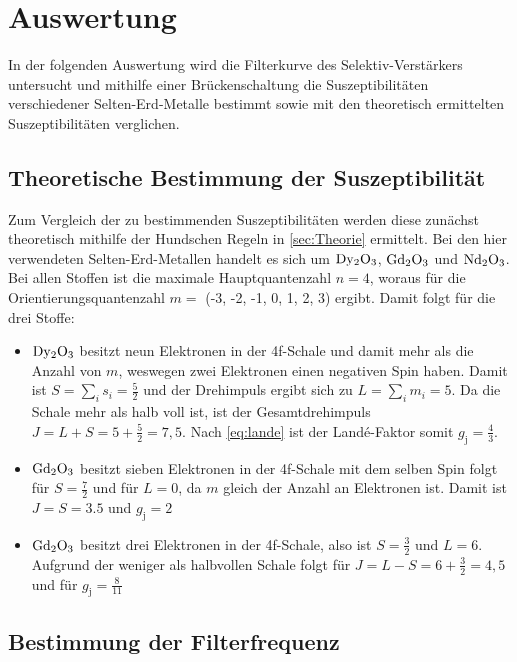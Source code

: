\section{Auswertung}
\label{sec:Auswertung}

In der folgenden Auswertung wird die Filterkurve des Selektiv-Verstärkers untersucht
und mithilfe einer Brückenschaltung die Suszeptibilitäten verschiedener Selten-Erd-Metalle bestimmt
sowie mit den theoretisch ermittelten Suszeptibilitäten verglichen.


\subsection{Theoretische Bestimmung der Suszeptibilität}

Zum Vergleich der zu bestimmenden Suszeptibilitäten werden diese zunächst theoretisch mithilfe der Hundschen Regeln in \autoref{sec:Theorie} ermittelt.
Bei den hier verwendeten Selten-Erd-Metallen handelt es sich um $\ce{Dy2O3}$, $\ce{Gd2O3}$ und $\ce{Nd2O3}$.
Bei allen Stoffen ist die maximale Hauptquantenzahl $n = 4$, woraus für die Orientierungsquantenzahl $m =$ (-3, -2, -1, 0, 1, 2, 3) ergibt. 
Damit folgt für die drei Stoffe:

\begin{itemize}
  \item $\ce{Dy2O3}$ besitzt neun Elektronen in der 4f-Schale und damit mehr als die Anzahl von $m$, weswegen zwei Elektronen einen negativen Spin haben.
        Damit ist $ S = \sum_{i} s_i = \frac{5}{2}$ und der Drehimpuls ergibt sich zu $L = \sum_i m_i = 5$.
        Da die Schale mehr als halb voll ist, ist der Gesamtdrehimpuls $J = L + S = 5 + \frac{5}{2} = 7,5$.
        Nach \autoref{eq:lande} ist der Landé-Faktor somit $g_\text{j} = \frac{4}{3}$.

  \item $\ce{Gd2O3}$ besitzt sieben Elektronen in der 4f-Schale mit dem selben Spin folgt für $S = \frac{7}{2}$ und für $L = 0$, da $m$ gleich der Anzahl an Elektronen ist.
        Damit ist $J = S = 3.5$ und $g_\text{j} = 2$

  \item $\ce{Gd2O3}$ besitzt drei Elektronen in der 4f-Schale, also ist $S = \frac{3}{2}$ und $L = 6$.
        Aufgrund der weniger als halbvollen Schale folgt für $J = L - S = 6 + \frac{3}{2} = 4,5$ und für $g_\text{j} = \frac{8}{11}$
\end{itemize}




\subsection{Bestimmung der Filterfrequenz}

